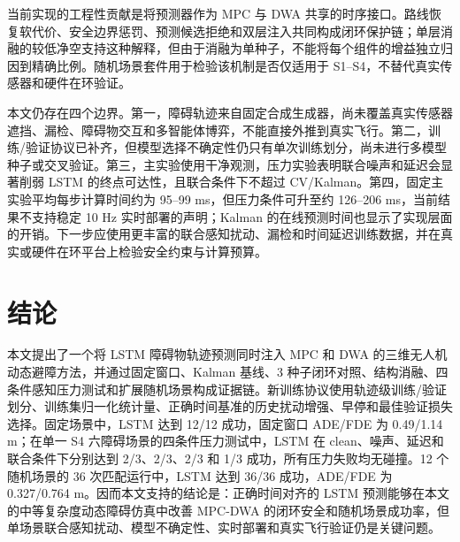 \documentclass[11pt,a4paper]{ctexart}
\begin{document}
当前实现的工程性贡献是将预测器作为 MPC 与 DWA 共享的时序接口。路线恢复软代价、安全边界惩罚、预测候选拒绝和双层注入共同构成闭环保护链；单层消融的较低净空支持这种解释，但由于消融为单种子，不能将每个组件的增益独立归因到精确比例。随机场景套件用于检验该机制是否仅适用于 S1–S4，不替代真实传感器和硬件在环验证。

本文仍存在四个边界。第一，障碍轨迹来自固定合成生成器，尚未覆盖真实传感器遮挡、漏检、障碍物交互和多智能体博弈，不能直接外推到真实飞行。第二，训练/验证协议已补齐，但模型选择不确定性仍只有单次训练划分，尚未进行多模型种子或交叉验证。第三，主实验使用干净观测，压力实验表明联合噪声和延迟会显著削弱 LSTM 的终点可达性，且联合条件下不超过 CV/Kalman。第四，固定主实验平均每步计算时间约为 95–99 ms，但压力条件可升至约 126–206 ms，当前结果不支持稳定 10 Hz 实时部署的声明；Kalman 的在线预测时间也显示了实现层面的开销。下一步应使用更丰富的联合感知扰动、漏检和时间延迟训练数据，并在真实或硬件在环平台上检验安全约束与计算预算。

\section{结论}

本文提出了一个将 LSTM 障碍物轨迹预测同时注入 MPC 和 DWA 的三维无人机动态避障方法，并通过固定窗口、Kalman 基线、3 种子闭环对照、结构消融、四条件感知压力测试和扩展随机场景构成证据链。新训练协议使用轨迹级训练/验证划分、训练集归一化统计量、正确时间基准的历史扰动增强、早停和最佳验证损失选择。固定场景中，LSTM 达到 12/12 成功，固定窗口 ADE/FDE 为 0.49/1.14 m；在单一 S4 六障碍场景的四条件压力测试中，LSTM 在 clean、噪声、延迟和联合条件下分别达到 2/3、2/3、2/3 和 1/3 成功，所有压力失败均无碰撞。12 个随机场景的 36 次匹配运行中，LSTM 达到 36/36 成功，ADE/FDE 为 0.327/0.764 m。因而本文支持的结论是：正确时间对齐的 LSTM 预测能够在本文的中等复杂度动态障碍仿真中改善 MPC-DWA 的闭环安全和随机场景成功率，但单场景联合感知扰动、模型不确定性、实时部署和真实飞行验证仍是关键问题。
\end{document}
